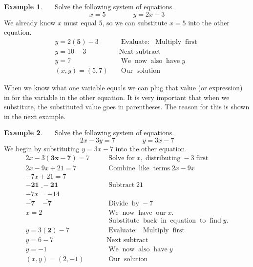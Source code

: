 \documentclass[12pt]{book}
\theoremstyle{definition}
\newtheorem{example}{Example}
\newcommand{\tmmathbf}[1]{\ensuremath{\boldsymbol{#1}}}
\newcommand{\tmop}[1]{\ensuremath{\operatorname{#1}}}
\begin{document}
\begin{example}~~~Solve the following system of equations.
$$x=5\qquad\qquad y=2x-3$$
We already know $x$ must equal 5, so we can substitute $x=5$ into the other equation.%
\begin{eqnarray*}
		y = 2 \tmmathbf{(5)} - 3 &  & \tmop{Evaluate:} \tmop{~Multiply}
    \tmop{first}\\
    y = 10 - 3~~~ &  & \tmop{Next~subtract}\\
    y = 7~~~~~~~~~~ &  & \tmop{We} \tmop{now} \tmop{also} \tmop{have} y\\
    (x,y)=(5, 7) &  & \tmop{Our} \tmop{solution}
  \end{eqnarray*}
\end{example}
When we know what one variable equals we can plug that value (or expression) in for the variable in the other equation. It is very important that when we
substitute, the substituted value goes in parentheses. The reason for this is shown in the next example.
\begin{example}~~~Solve the following system of equations.
$$2 x - 3 y = 7\qquad\qquad y = 3 x - 7$$
We begin by substituting $y=3x-7$ into the other equation.
  \begin{eqnarray*}
    2 x - 3 \tmmathbf{(3 x - 7)} = 7~~~~ &  & \tmop{Solve~for} x, %
		\tmop{distributing} - 3 \tmop{first}\\
    2 x - 9 x + 21 = 7~~~~ &  & \tmop{Combine} \tmop{like} \tmop{terms} 2 x - 9x\\
    - 7 x + 21 = 7~~~~ &  &\\
    \underline{\tmmathbf{- 21 ~~- 21}} &  & \tmop{Subtract} 21 \\
    - 7 x = - 14 &  &\\
    \tmmathbf{\overline{- 7} ~~~~~ \overline{- 7}} &  & \tmop{Divide} \tmop{by} - 7 \\
    x = 2~~~~ &  & \tmop{We} \tmop{now} \tmop{have} \tmop{our} x.\\
		& & \tmop{Substitute} \tmop{back} \tmop{in} \tmop{equation} \tmop{to} \tmop{find} y.\\
    y = 3 \tmmathbf{(2)} - 7 &  & \tmop{Evaluate:} \tmop{~Multiply} \tmop{first}\\
    y = 6 - 7~~~~ &  & \tmop{Next~subtract}\\
    y = - 1~~~~~~~ &  & \tmop{We} \tmop{now} \tmop{also} \tmop{have} y\\
    (x,y)=(2, - 1) &  & \tmop{Our} \tmop{solution}
  \end{eqnarray*}
\end{example}
\end{document}

